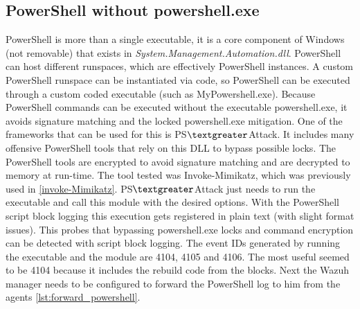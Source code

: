 \subsection{PowerShell without powershell.exe}
PowerShell is more than a single executable, it is a core component of Windows (not removable) that exists in \textit{System.Management.Automation.dll}.
PowerShell can host different runspaces, which are effectively PowerShell instances.
A custom PowerShell runspace can be instantiated via code, so PowerShell can be executed through a custom coded executable (such as MyPowershell.exe).
\linej
Because PowerShell commands can be executed without the executable powershell.exe, it avoids signature matching and the locked powershell.exe mitigation\cite{powershell_adsecurity}.
\linej
\linej
One of the frameworks that can be used for this is PS$\textgreater$Attack\cite{PSAttack}.
It includes many offensive PowerShell tools that rely on this DLL to bypass possible locks.
The PowerShell tools are encrypted to avoid signature matching and are decrypted to memory at run-time\cite{powershell_adsecurity}.
\linej
The tool tested was Invoke-Mimikatz, which was previously used in \ref{invoke-Mimikatz}.
\linej
PS$\textgreater$Attack just needs to run the executable and call this module with the desired options.
\linej
\linej
With the PowerShell script block logging this execution gets registered in plain text (with slight format issues).
This probes that bypassing powershell.exe locks and command encryption can be detected with script block logging.
The event IDs generated by running the executable and the module are 4104, 4105 and 4106. The most useful seemed to be 4104 because it includes the rebuild code from the blocks.
\linej
\linej
Next the Wazuh manager needs to be configured to forward the PowerShell log to him from the agents \ref{lst:forward_powershell}.
